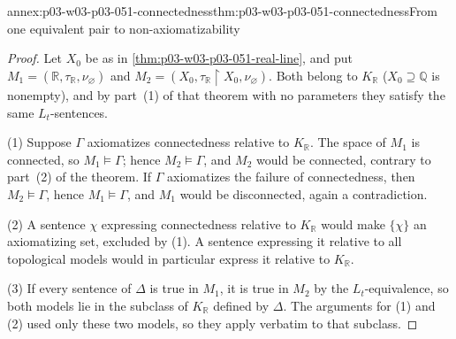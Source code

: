 \begin{annexitem}{annex:p03-w03-p03-051-connectedness}{thm:p03-w03-p03-051-connectedness}{From one equivalent pair to non-axiomatizability}
\begin{proof}
Let \(X_0\) be as in \cref{thm:p03-w03-p03-051-real-line}, and put
\(M_1=(\mathbb R,\tau_{\mathbb R},\nu_\varnothing)\) and
\(M_2=(X_0,\tau_{\mathbb R}\restriction X_0,\nu_\varnothing)\). Both belong
to \(K_{\mathbb R}\) (\(X_0\supseteq\mathbb Q\) is nonempty), and by
part~(1) of that theorem with no parameters they satisfy the same
\(L_t\)-sentences.

(1) Suppose \(\Gamma\) axiomatizes connectedness relative to
\(K_{\mathbb R}\). The space of \(M_1\) is connected, so
\(M_1\models\Gamma\); hence \(M_2\models\Gamma\), and \(M_2\) would be
connected, contrary to part~(2) of the theorem. If \(\Gamma\) axiomatizes
the failure of connectedness, then \(M_2\models\Gamma\), hence
\(M_1\models\Gamma\), and \(M_1\) would be disconnected, again a
contradiction.

(2) A sentence \(\chi\) expressing connectedness relative to
\(K_{\mathbb R}\) would make \(\{\chi\}\) an axiomatizing set, excluded by
(1). A sentence expressing it relative to all topological models would in
particular express it relative to \(K_{\mathbb R}\).

(3) If every sentence of \(\Delta\) is true in \(M_1\), it is true in
\(M_2\) by the \(L_t\)-equivalence, so both models lie in the subclass of
\(K_{\mathbb R}\) defined by \(\Delta\). The arguments for (1) and (2) used
only these two models, so they apply verbatim to that subclass.
\end{proof}
\end{annexitem}

